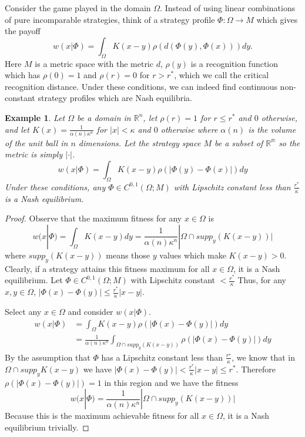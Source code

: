 \documentclass[]{article}
\newtheorem{example}[theorem]{Example}
\begin{document}
		Consider the game played in the domain $\Omega$. Instead of using linear combinations of pure incomparable strategies, think of a strategy profile $\Phi:\Omega \rightarrow M$ which gives the payoff
		\begin{equation}
			w(x|\Phi)= \int_\Omega K(x-y)\rho(d(\Phi(y),\Phi(x)))dy.
		\end{equation}
		Here $M$ is a metric space with the metric $d$, $\rho(y)$ is a recognition function which has $\rho (0)=1$ and $\rho(r)=0$ for $r>r^*$, which we call the critical recognition distance. Under these conditions, we can indeed find continuous non-constant strategy profiles which are Nash equilibria.  
	
		\begin{example}
			Let $\Omega$ be a domain in $\mathbb{R}^n$, let $\rho(r)=1$ for $r\leq r^*$ and $0$ otherwise, and let $K(x)=\frac{1}{\alpha(n)\kappa^n}$ for $|x|<\kappa$ and $0$ otherwise where $\alpha(n)$ is the volume of the unit ball in $n$ dimensions. Let the strategy space $M$ be a subset of $\mathbb{R^m}$ so the metric is simply $|\cdot|$.
			\begin{equation}
				w(x|\Phi)=\int_\Omega K(x-y)\rho(|\Phi(y)-\Phi(x)|)dy
			\end{equation} 
			Under these conditions, any $\Phi \in C^{0,1}(\Omega; M)$ with Lipschitz constant less than $\frac{r^*}{\kappa}$ is a Nash equilibrium.
		\end{example}
		
		\begin{proof}
			Observe that the maximum fitness for any $x\in \Omega$ is \begin{equation}
				w(x|\Phi)=\int_\Omega K(x-y)dy=\frac{1}{\alpha(n)\kappa^n}|\Omega\cap supp_y(K(x-y))|
			\end{equation}
			where $supp_y(K(x-y))$ means those $y$ values which make $K(x-y)>0$. 
			Clearly, if a strategy attains this fitness maximum for all $x\in \Omega$, it is a Nash equilibrium. Let $\Phi\in C^{0,1}(\Omega;M)$ with Lipschitz constant $<\frac{r^*}{\kappa}$ Thus, for any $x,y\in \Omega$, $|\Phi(x)-\Phi(y)|\leq \frac{r^*}{\kappa}|x-y|$.
			
			Select any $x\in\Omega$ and consider $w(x|\Phi)$. 
			\begin{equation}
				\begin{split}
					w(x|\Phi)&=\int_\Omega K(x-y)\rho(|\Phi(x)-\Phi(y)|)dy\\
					&=\frac{1}{\alpha(n)\kappa^n}\int_{\Omega\cap supp_y (K(x-y))}\rho(|\Phi(x)-\Phi(y)|)dy
				\end{split}
			\end{equation} 
			By the assumption that $\Phi$ has a Lipschitz constant less than $\frac{r^\star}{\kappa}$, we know that in $\Omega\cap supp_yK(x-y)$ we have $|\Phi(x)-\Phi(y)|< \frac{r^*}{\kappa}|x-y|\leq r^*$. Therefore $\rho(|\Phi(x)-\Phi(y)|)=1$ in this region and we have the fitness
			\begin{equation}
				w(x|\Phi)=\frac{1}{\alpha(n)\kappa^n}|\Omega\cap supp_y(K(x-y))|
			\end{equation}
			Because this is the maximum achievable fitness for all $x\in \Omega$, it is a Nash equilibrium trivially. 
		\end{proof} 
		
\end{document}

